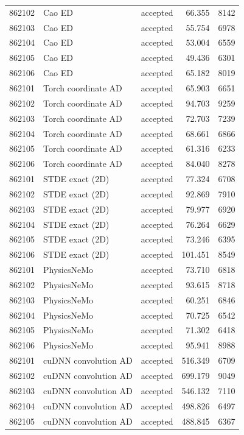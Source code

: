 \documentclass[11pt]{article}
\begin{document}
\begin{longtable}{rllrr}
862102 & Cao ED & accepted & 66.355 & 8142\\
862103 & Cao ED & accepted & 55.754 & 6978\\
862104 & Cao ED & accepted & 53.004 & 6559\\
862105 & Cao ED & accepted & 49.436 & 6301\\
862106 & Cao ED & accepted & 65.182 & 8019\\
862101 & Torch coordinate AD & accepted & 65.903 & 6651\\
862102 & Torch coordinate AD & accepted & 94.703 & 9259\\
862103 & Torch coordinate AD & accepted & 72.703 & 7239\\
862104 & Torch coordinate AD & accepted & 68.661 & 6866\\
862105 & Torch coordinate AD & accepted & 61.316 & 6233\\
862106 & Torch coordinate AD & accepted & 84.040 & 8278\\
862101 & STDE exact (2D) & accepted & 77.324 & 6708\\
862102 & STDE exact (2D) & accepted & 92.869 & 7910\\
862103 & STDE exact (2D) & accepted & 79.977 & 6920\\
862104 & STDE exact (2D) & accepted & 76.264 & 6629\\
862105 & STDE exact (2D) & accepted & 73.246 & 6395\\
862106 & STDE exact (2D) & accepted & 101.451 & 8549\\
862101 & PhysicsNeMo & accepted & 73.710 & 6818\\
862102 & PhysicsNeMo & accepted & 93.615 & 8718\\
862103 & PhysicsNeMo & accepted & 60.251 & 6846\\
862104 & PhysicsNeMo & accepted & 70.725 & 6542\\
862105 & PhysicsNeMo & accepted & 71.302 & 6418\\
862106 & PhysicsNeMo & accepted & 95.941 & 8988\\
862101 & cuDNN convolution AD & accepted & 516.349 & 6709\\
862102 & cuDNN convolution AD & accepted & 699.179 & 9049\\
862103 & cuDNN convolution AD & accepted & 546.132 & 7110\\
862104 & cuDNN convolution AD & accepted & 498.826 & 6497\\
862105 & cuDNN convolution AD & accepted & 488.845 & 6367\\

\end{longtable}
\end{document}
